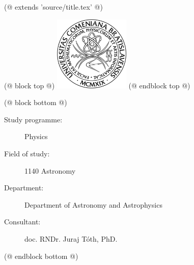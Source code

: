 (@ extends 'source/title.tex' @)

(@ block top @)
    \includegraphics[keepaspectratio = true, width = 36mm]{source/pictures/fmfi.jpg}
    \vspace{10mm}
(@ endblock top @)

(@ block bottom @)
    \vspace{40mm}
    {
        \footnotesize
        \begin{description}
            \item[Study programme:] Physics
            \item[Field of study:]  1140 Astronomy
            \item[Department:]      Department of Astronomy and Astrophysics
            \item[Consultant:]      doc. RNDr. Juraj Tóth, PhD.
        \end{description}
    }
(@ endblock bottom @)
